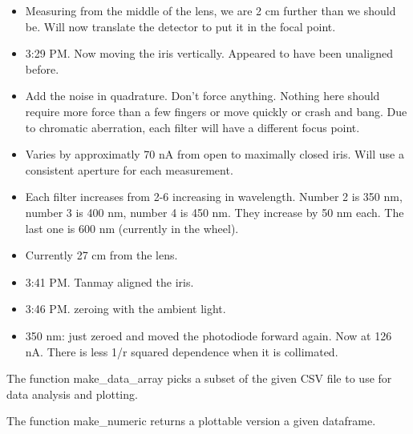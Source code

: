 \documentclass[11pt]{article}
\begin{document}
\begin{itemize}
\item Measuring from the middle of the lens, we are 2 cm further than we should be. Will now translate the detector to put it in the focal point. 
\item 3:29 PM. Now moving the iris vertically. Appeared to have been unaligned before. 
\item Add the noise in quadrature. Don't force anything. Nothing here should require more force than a few fingers or move quickly or crash and bang. Due to chromatic aberration, each filter will have a different focus point. 
\item Varies by approximatly 70 nA from open to maximally closed iris. Will use a consistent aperture for each measurement. 
\item Each filter increases from 2-6 increasing in wavelength. Number 2 is 350 nm, number 3 is 400 nm, number 4 is 450 nm. They increase by 50 nm each. The last one is 600 nm (currently in the wheel). 
\item Currently 27 cm from the lens.
\item 3:41 PM. Tanmay aligned the iris. 
\item 3:46 PM. zeroing with the ambient light.
\item 350 nm: just zeroed and moved the photodiode forward again. Now at 126 nA. There is less 1/r squared dependence when it is collimated.  


\end{itemize}

    The function make\_data\_array picks a subset of the given CSV file to
use for data analysis and plotting.

The function make\_numeric returns a plottable version a given
dataframe.
\end{document}

